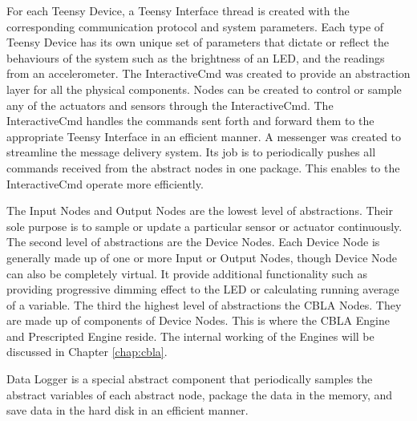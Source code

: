 For each Teensy Device, a Teensy Interface thread is created with the corresponding communication protocol and system parameters. Each type of Teensy Device has its own unique set of parameters that dictate or reflect the behaviours of the system such as the brightness of an LED, and the readings from an accelerometer. The InteractiveCmd was created to provide an abstraction layer for all the physical components. Nodes can be created to control or sample any of the actuators and sensors through the InteractiveCmd. The InteractiveCmd handles the commands sent forth and forward them to the appropriate Teensy Interface in an efficient manner. A messenger was created to streamline the message delivery system. Its job is to periodically pushes all commands received from the abstract nodes in one package. This enables to the InteractiveCmd operate more efficiently. 

The Input Nodes and Output Nodes are the lowest level of abstractions. Their sole purpose is to sample or update a particular sensor or actuator continuously. The second level of abstractions are the Device Nodes. Each Device Node is generally made up of one or more Input or Output Nodes, though Device Node can also be completely virtual. It provide additional functionality such as providing progressive dimming effect to the LED or calculating running average of a variable. The third the highest level of abstractions the CBLA Nodes. They are made up of components of Device Nodes. This is where the CBLA Engine and Prescripted Engine reside. The internal working of the Engines will be discussed in Chapter \ref{chap:cbla}.

Data Logger is a special abstract component that periodically samples the abstract variables of each abstract node, package the data in the memory, and save data in the hard disk in an efficient manner. 


